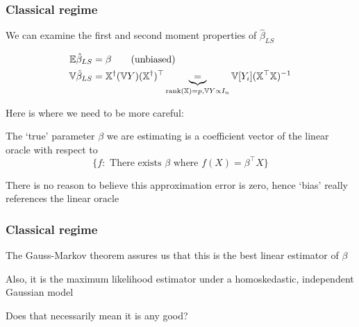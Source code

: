 \documentclass{beamer}
\begin{document}
\begin{frame}
\frametitle{Classical regime}
We can examine the first and second moment properties of $\hat\beta_{LS}$

\begin{align}
\label{eq:bias}
\mathbb{E} \hat\beta_{LS}  & =  \beta \qquad (\textrm{unbiased})\\
\label{eq:var}
\mathbb{V} \hat\beta_{LS}  & =  \mathbb{X}^{\dagger} (\mathbb{V} Y) (\mathbb{X}^{\dagger})^{\top}  
\underbrace{=}_{\textrm{rank}(\mathbb{X}) = p, \mathbb{V} Y \propto I_n} 
 \mathbb{V}[Y_i] (\mathbb{X}^{\top}\mathbb{X})^{-1} 
\end{align}

 Here is where we need to be more careful:

\vsp
The `true' parameter $\beta$ we are estimating is a coefficient vector of 
the linear oracle with respect
to 
\[
\{ f: \textrm{ There exists } \beta \textrm{ where } f(X) = \beta^\top X\}
\]

\vsp 
There is no reason to believe this approximation error is zero, hence `bias' really references
the linear oracle
\end{frame}

\begin{frame}
\frametitle{Classical regime}

The Gauss-Markov theorem assures us that this is the best linear  estimator of $\beta$


\vsp
Also, it is the maximum likelihood estimator under a homoskedastic, independent Gaussian model

\vsp

Does that necessarily mean it is any good?
\end{frame}
%
%
%
%
%
%
%
\end{document}
